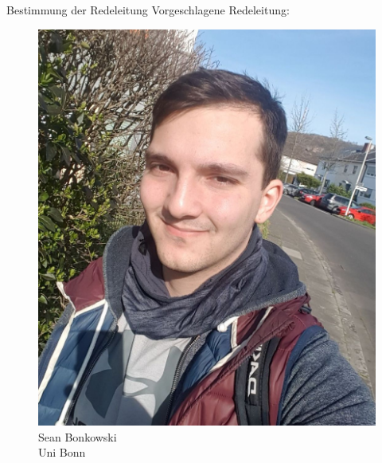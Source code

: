 \documentclass[compress, aspectratio=169]{beamer}
\begin{document}
	\begin{frame}{Bestimmung der Redeleitung}
		\centering
		Vorgeschlagene Redeleitung:
		\vspace{.5cm}
		
		\hspace{0.1\textwidth}
		\begin{minipage}{.3\textwidth}
			\begin{figure}
				\begin{minipage}[c]{.65\textwidth}
					\includegraphics[height=0.5\textheight]{sean.jpg}
				\end{minipage} \hfill
				\begin{minipage}[c]{.32\textwidth}
					\caption*{Sean Bonkowski \\ Uni Bonn}
				\end{minipage}
			\end{figure}
		\end{minipage}
		\hspace{0.1\textwidth}
		\begin{minipage}{0.4\textwidth}
			\begin{figure}
				\begin{minipage}[c]{.65\textwidth}

\end{minipage}
\end{figure}
\end{minipage}
\end{frame}
\end{document}
